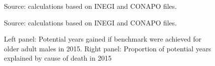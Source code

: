 \documentclass{bmcart}
\begin{document}
\begin{backmatter}
\begin{figure}[h!]

Source: calculations based on INEGI and CONAPO files. 
\end{figure}


\begin{figure}[h!]
\centering
\caption{Left panel: Potential years gained if benchmark were achieved for older adult males in 2015. Right panel: Proportion of potential years explained by cause of death in 2015 }
\label{Fig5}

Source: calculations based on INEGI and CONAPO files. 
\end{figure}




\end{backmatter}
\end{document}
